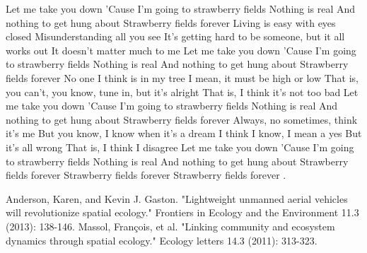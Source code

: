 \documentclass[12pt]{article}
\begin{document}
Let me take you down
'Cause I'm going to strawberry fields
Nothing is real
And nothing to get hung about
Strawberry fields forever
Living is easy with eyes closed
Misunderstanding all you see
It's getting hard to be someone, but it all works out
It doesn't matter much to me
Let me take you down
'Cause I'm going to strawberry fields
Nothing is real
And nothing to get hung about
Strawberry fields forever
No one I think is in my tree
I mean, it must be high or low
That is, you can't, you know, tune in, but it's alright
That is, I think it's not too bad
Let me take you down
'Cause I'm going to strawberry fields
Nothing is real
And nothing to get hung about
Strawberry fields forever
Always, no sometimes, think it's me
But you know, I know when it's a dream
I think I know, I mean a yes
But it's all wrong
That is, I think I disagree
Let me take you down
'Cause I'm going to strawberry fields
Nothing is real
And nothing to get hung about \cite{Massol2011}
Strawberry fields forever
Strawberry fields forever
Strawberry fields forever \cite{Anderson2013}.

\begin{thebibliography}{999}
    Anderson, Karen, and Kevin J. Gaston. "Lightweight unmanned aerial vehicles will revolutionize spatial ecology." Frontiers in Ecology and the Environment 11.3 (2013): 138-146.
%
    Massol, François, et al. "Linking community and ecosystem dynamics through spatial ecology." Ecology letters 14.3 (2011): 313-323.
\end{thebibliography}
\end{document}
